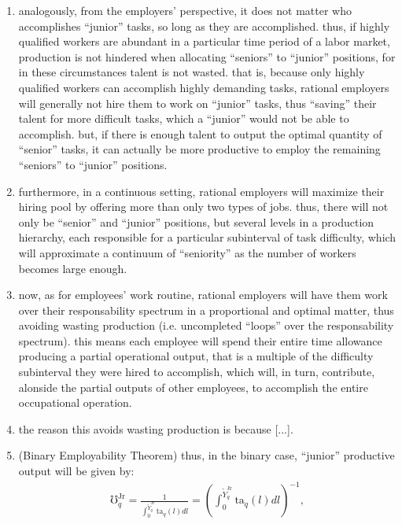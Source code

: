 \documentclass[hidelinks, nonatbib]{elsarticle}
\begin{document}
\begin{enumerate}
    \item analogously, from the employers' perspective, it does not matter who accomplishes ``junior'' tasks, so long as they are accomplished. thus, if highly qualified workers are abundant in a particular time period of a labor market, production is not hindered when allocating ``seniors'' to ``junior'' positions, for in these circumstances talent is not wasted. that is, because only highly qualified workers can accomplish highly demanding tasks, rational employers will generally not hire them to work on ``junior'' tasks, thus ``saving'' their talent for more difficult tasks, which a ``junior'' would not be able to accomplish. but, if there is enough talent to output the optimal quantity of ``senior'' tasks, it can actually be more productive to employ the remaining ``seniors'' to ``junior'' positions.
    \item furthermore, in a continuous setting, rational employers will maximize their hiring pool by offering more than only two types of jobs. thus, there will not only be ``senior'' and ``junior'' positions, but several levels in a production hierarchy, each responsible for a particular subinterval of task difficulty, which will approximate a continuum of ``seniority'' as the number of workers becomes large enough.
    \item now, as for employees' work routine, rational employers will have them work over their responsability spectrum in a proportional and optimal matter, thus avoiding wasting production (i.e. uncompleted ``loops'' over the responsability spectrum). this means each employee will spend their entire time allowance producing a partial operational output, that is a multiple of the difficulty subinterval they were hired to accomplish, which will, in turn, contribute, alonside the partial outputs of other employees, to accomplish the entire occupational operation.
    \item the reason this avoids wasting production is because [...].
    \item (Binary Employability Theorem) thus, in the binary case, ``junior'' productive output will be given by:
    \begin{gather}
        \mho_{q}^{\text{Jr}} =
        \frac{
            1
        }{
            \int_{0}^{\tilde{Y}_{q}^{\text{Jr}}}
            \text{ta}_q(l)
            dl
        } = 
        \left(
            \int_{0}^{\tilde{Y}_{q}^{\text{Jr}}}
                \text{ta}_q(l)
                dl
        \right) ^ {-1}
        ,
    \end{gather}

\end{enumerate}
\end{document}
